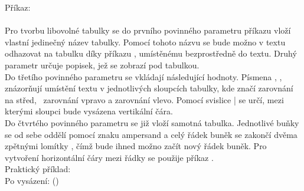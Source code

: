 \documentclass[a4paper, 12pt]{report}
\begin{document}
	Příkaz:\\
	\\
	Pro tvorbu libovolné tabulky se do prvního povinného parametru příkazu  vloží vlastní jedinečný název tabulky. Pomocí tohoto názvu se bude možno v textu odhazovat na tabulku díky příkazu , umístěnému bezprostředně do textu. Druhý parametr určuje popisek, jež se zobrazí pod tabulkou.\\
	Do třetího povinného parametru se vkládají následující hodnoty. Písmena , ,  znázorňují umístění textu v jednotlivých sloupcích tabulky, kde  značí zarovnání na střed, ~zarovnání vpravo a  zarovnání vlevo. Pomocí svislice | se určí, mezi kterými sloupci bude vysázena vertikální čára.\\
	Do čtvrtého povinného parametru se již vloží samotná tabulka. Jednotlivé buňky se od sebe oddělí pomocí znaku ampersand \kurziva{\&} a celý řádek buněk se zakončí dvěma zpětnými lomítky \kurziva{$\backslash \backslash$}, čímž bude ihned možno začít nový řádek buněk. Pro vytvoření horizontální čáry mezi řádky se použije příkaz .\\[1cm]
	\novastrana
	Praktický příklad:\\
	Po vysázení: ()
	
\end{document}
